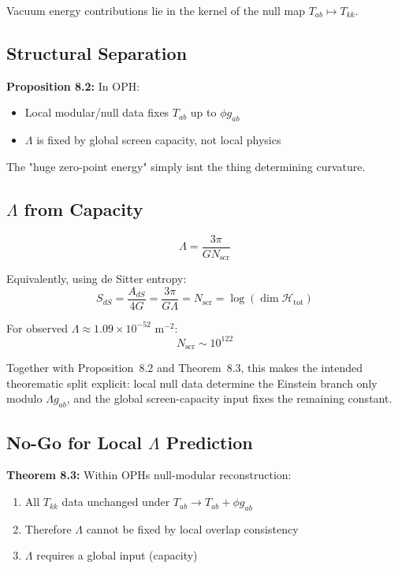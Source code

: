 Vacuum energy contributions lie in the kernel of the null map \(T_{ab} \mapsto T_{kk}\).

\subsection{Structural Separation}\label{82-structural-separation}

\textbf{Proposition 8.2:} In OPH:

\begin{itemize}
\tightlist
\item
 Local modular/null data fixes \(T_{ab}\) up to \(\phi g_{ab}\)
\item
 \(\Lambda\) is fixed by global screen capacity, not local physics
\end{itemize}

The "huge zero-point energy" simply isn\textquotesingle t the thing determining curvature.

\subsection{\texorpdfstring{\(\Lambda\) from Capacity}{Lambda from Capacity}}\label{83-ux3bb-from-capacity}

\[\Lambda = \frac{3\pi}{G N_{\mathrm{scr}}}\]

Equivalently, using de Sitter entropy: \[S_{dS} = \frac{A_{dS}}{4G} = \frac{3\pi}{G\Lambda} = N_{\mathrm{scr}} = \log(\dim \mathcal{H}_{\text{tot}})\]

For observed \(\Lambda \approx 1.09 \times 10^{-52}\) m\(^{-2}\): \[N_{\mathrm{scr}} \sim 10^{122}\]

Together with Proposition~8.2 and Theorem~8.3, this makes the intended theorematic split explicit: local null data determine the Einstein branch only modulo \(\Lambda g_{ab}\), and the global screen-capacity input fixes the remaining constant.

\subsection{\texorpdfstring{No-Go for Local \(\Lambda\) Prediction}{No-Go for Local Lambda Prediction}}\label{84-no-go-for-local-ux3bb-prediction}

\textbf{Theorem 8.3:} Within OPH\textquotesingle s null-modular reconstruction:

\begin{enumerate}
\def\labelenumi{\arabic{enumi}.}
\tightlist
\item
 All \(T_{kk}\) data unchanged under \(T_{ab} \to T_{ab} + \phi g_{ab}\)
\item
 Therefore \(\Lambda\) cannot be fixed by local overlap consistency
\item
 \(\Lambda\) requires a global input (capacity)
\end{enumerate}

